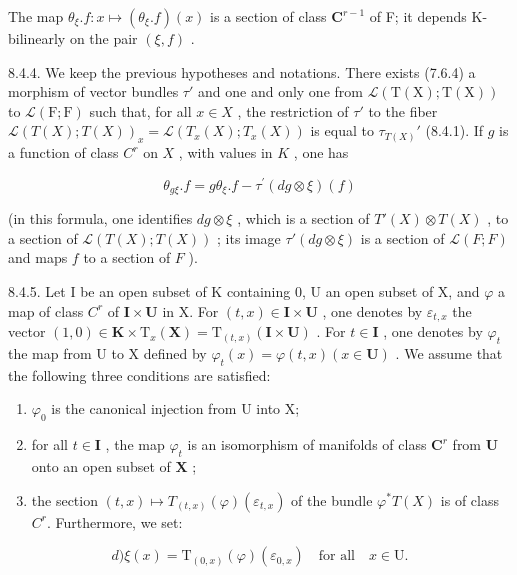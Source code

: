 The map \(\theta_{\xi}.f: x \mapsto (\theta_{\xi}.f)(x)\) is a section of class \(\mathbf{C}^{r-1}\) of F; it depends K-bilinearly on the pair \((\xi, f)\) .

8.4.4. We keep the previous hypotheses and notations. There exists (7.6.4) a morphism of vector bundles \(\tau'\) and one and only one from \(\mathcal{L}(\mathrm{T}(\mathrm{X});\mathrm{T}(\mathrm{X}))\) to \(\mathcal{L}(\mathrm{F};\mathrm{F})\) such that, for all \(x \in X\) , the restriction of \(\tau'\) to the fiber \(\mathcal{L}(T(X); T(X))_x = \mathcal{L}(T_x(X); T_x(X))\) is equal to \(\tau_{T(X)}'\) (8.4.1). If \(g\) is a function of class \(C^r\) on \(X\) , with values in \(K\) , one has

\[
\theta_ {g \xi}. f = g \theta_ {\xi}. f - \tau^ {\prime} (d g \otimes \xi) (f)
\]

(in this formula, one identifies \(dg \otimes \xi\) , which is a section of \(T'(X) \otimes T(X)\) , to a section of \(\mathcal{L}(T(X); T(X))\) ; its image \(\tau'(dg \otimes \xi)\) is a section of \(\mathcal{L}(F; F)\) and maps \(f\) to a section of \(F\) ).

8.4.5. Let I be an open subset of K containing 0, U an open subset of X, and \(\varphi\) a map of class \(C^r\) of \(\mathbf{I} \times \mathbf{U}\) in X. For \((t, x) \in \mathbf{I} \times \mathbf{U}\) , one denotes by \(\varepsilon_{t,x}\) the vector \((1, 0) \in \mathbf{K} \times \mathrm{T}_x(\mathbf{X}) = \mathrm{T}_{(t,x)}(\mathbf{I} \times \mathbf{U})\) . For \(t \in \mathbf{I}\) , one denotes by \(\varphi_t\) the map from U to X defined by \(\varphi_t(x) = \varphi(t, x) (x \in \mathbf{U})\) . We assume that the following three conditions are satisfied:

\begin{enumerate}
\def\labelenumi{\alph{enumi})}
\item
  \(\varphi_{0}\) is the canonical injection from U into X;
\item
  for all \(t \in \mathbf{I}\) , the map \(\varphi_t\) is an isomorphism of manifolds of class \(\mathbf{C}^r\) from \(\mathbf{U}\) onto an open subset of \(\mathbf{X}\) ;
\item
  the section \((t, x) \mapsto T_{(t, x)}(\varphi)(\varepsilon_{t,x})\) of the bundle \(\varphi^*T(X)\) is of class \(C^r\). Furthermore, we set:
\end{enumerate}

\[
d) \xi (x) = \mathrm{T} _ {(0, x)} (\varphi) (\varepsilon_ {0, x}) \quad \text {for all} \quad x \in \mathrm{U}.
\]

